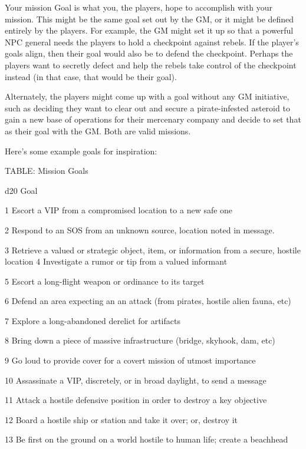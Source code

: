 Your mission Goal is what you, the players, hope to accomplish with your mission. This might be
the same goal set out by the GM, or it might be defined entirely by the players. For example, the
GM might set it up so that a powerful NPC general needs the players to hold a checkpoint
against rebels. If the player’s goals align, then their goal would also be to defend the checkpoint.
Perhaps the players want to secretly defect and help the rebels take control of the checkpoint
instead (in that case, that would be their goal).


Alternately, the players might come up with a goal without any GM initiative, such as deciding
they want to clear out and secure a pirate-infested asteroid to gain a new base of operations for
their mercenary company and decide to set that as their goal with the GM. Both are valid
missions.





Here’s some example goals for inspiration:


TABLE: Mission Goals


 d20       Goal

 1         Escort a VIP from a compromised location to a new safe one

 2         Respond to an SOS from an unknown source, location noted in message.

 3         Retrieve a valued or strategic object, item, or information from a secure, hostile
           location
 4         Investigate a rumor or tip from a valued informant

 5         Escort a long-flight weapon or ordinance to its target

 6         Defend an area expecting an an attack (from pirates, hostile alien fauna, etc)

 7         Explore a long-abandoned derelict for artifacts

 8         Bring down a piece of massive infrastructure (bridge, skyhook, dam, etc)

 9         Go loud to provide cover for a covert mission of utmost importance

  10       Assassinate a VIP, discretely, or in broad daylight, to send a message

  11       Attack a hostile defensive position in order to destroy a key objective

  12       Board a hostile ship or station and take it over; or, destroy it

  13       Be first on the ground on a world hostile to human life; create a beachhead

